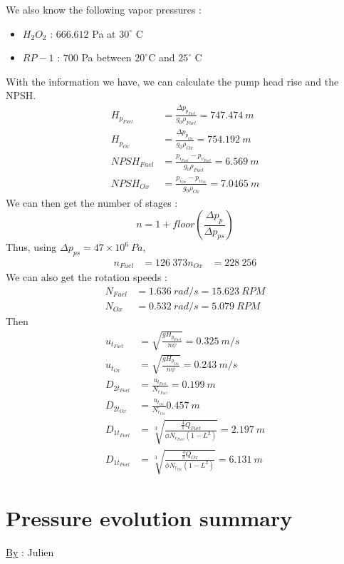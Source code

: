 We also know the following vapor pressures :
\begin{itemize}
	\item $H_2O_2$ : $666.612$ Pa at $30^\circ$ C
	\item $RP-1$ : $700$ Pa between $20^\circ$C and $25^\circ$ C
\end{itemize}
With the information we have, we can calculate the pump head rise and the NPSH.
\begin{align}
	H_{p_{Fuel}} &= \frac{\Delta p_{p_{Fuel}}}{g_0 \rho_{Fuel}} = 747.474\ m\\
	H_{p_{Ox}} &= \frac{\Delta p_{p_{Ox}}}{g_0 \rho_{Ox}} = 754.192\ m\\
	NPSH_{Fuel} &= \frac{p_{i_{Fuel}} - p_{v_{Fuel}}}{g_0 \rho_{Fuel}} = 6.569\ m\\
	NPSH_{Ox} &= \frac{p_{i_{Ox}} - p_{v_{Ox}}}{g_0 \rho_{Ox}} = 7.0465\ m
\end{align}
We can then get the number of stages :
\begin{equation}
	n= 1 +floor(\frac{\Delta p_p}{\Delta p_{ps}})
\end{equation}
Thus, using $\Delta p_{ps} = 47\times 10^6\ Pa$,
\begin{align}
	n_{Fuel} &= 126\ 373
	n_{Ox} &= 228\ 256
\end{align}
We can also get the rotation speeds :
\begin{align}
	N_{Fuel} &= 1.636\ rad/s = 15.623\ RPM\\
	N_{Ox} &= 0.532\ rad/s = 5.079\ RPM
\end{align}
Then
\begin{align}
	u_{t_{Fuel}} &= \sqrt{\frac{gH_{p_{Fuel}}}{n\psi}}=0.325\ m/s\\
	u_{t_{Ox}} &= \sqrt{\frac{gH_{p_{Ox}}}{n\psi}} =0.243\ m/s\\
	D_{2t_{Fuel}} &=\frac{u_{t_{Fuel}}}{N_{r_{Fuel}}}= 0.199\ m\\
	D_{2t_{Ox}} &= \frac{u_{t_{Ox}}}{N_{r_{Ox}}} 0.457\ m\\
	D_{1t_{Fuel}} &= \sqrt[3]{\frac{\frac{4}{\pi}Q_{Fuel}}{\phi N_{r_{Fuel}}(1-L^2)}} = 2.197\ m\\
	D_{1t_{Fuel}} &=\sqrt[3]{\frac{\frac{4}{\pi}Q_{Ox}}{\phi N_{r_{Ox}}(1-L^2)}} = 6.131\ m
\end{align}
\section{Pressure evolution summary}
\qquad \underline{By} : Julien\\

